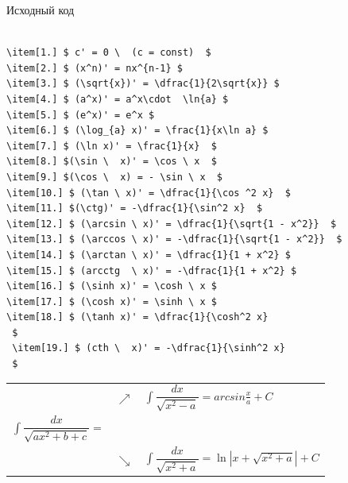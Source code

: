 \documentclass{beamer}
\begin{document}
\begin{frame}[fragile]{Исходный код}
\begin{adjustbox}{width=15cm,height=3.5cm,keepaspectratio}
 \begin{lstlisting}[language=Tex]

\item[1.] $ c' = 0 \  (c = const)  $
\item[2.] $ (x^n)' = nx^{n-1} $
\item[3.] $ (\sqrt{x})' = \dfrac{1}{2\sqrt{x}} $
\item[4.] $ (a^x)' = a^x\cdot  \ln{a} $
\item[5.] $ (e^x)' = e^x $
\item[6.] $ (\log_{a} x)' = \frac{1}{x\ln a} $
\item[7.] $ (\ln x)' = \frac{1}{x}  $ 
\item[8.] $(\sin \  x)' = \cos \ x  $ 
\item[9.] $(\cos \  x) = - \sin \ x  $ 
\item[10.] $ (\tan \ x)' = \dfrac{1}{\cos ^2 x}  $
\item[11.] $(\ctg)' = -\dfrac{1}{\sin^2 x}  $
\item[12.] $ (\arcsin \ x)' = \dfrac{1}{\sqrt{1 - x^2}}  $ 
\item[13.] $ (\arccos \ x)' = -\dfrac{1}{\sqrt{1 - x^2}}  $ 
\item[14.] $ (\arctan \ x)' = \dfrac{1}{1 + x^2} $
\item[15.] $ (arcctg  \ x)' = -\dfrac{1}{1 + x^2} $
\item[16.] $ (\sinh x)' = \cosh \ x $
\item[17.] $ (\cosh x)' = \sinh \ x $
\item[18.] $ (\tanh x)' = \dfrac{1}{\cosh^2 x}
 $
 \item[19.] $ (cth \  x)' = -\dfrac{1}{\sinh^2 x}
 $
\end{lstlisting}
\end{adjustbox}
\end{frame}

\begin{frame}
\begin{tabular}{l l l} 
   &  {$\nearrow $} & {$ \int \dfrac{dx}{\sqrt{x^2-a}}=arcsin\frac{x}{a} + C $} \\
  $ \int \dfrac{dx}{\sqrt{ax^2 + b + c}} = $ &  &  \\ 
       & $\searrow $ & $ \int \dfrac{dx}{\sqrt{x^2+a}} = \ln|x+\sqrt{x^2+a}| + C  $\\ 
  \end{tabular}

\end{frame}
\end{document}
